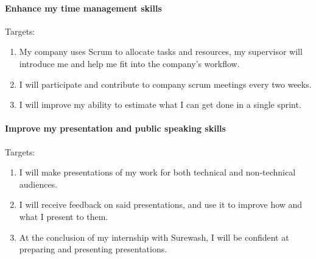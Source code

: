         \paragraph{Enhance my time management skills}
        Targets:
        \begin{enumerate}
            \item My company uses Scrum to allocate tasks and resources, my supervisor will introduce me and help me fit into the company’s workflow.
            \item I will participate and contribute to company scrum meetings every two weeks.
            \item I will improve my ability to estimate what I can get done in a single sprint.
        \end{enumerate}

        \paragraph{Improve my presentation and public speaking skills}
        Targets:
        \begin{enumerate}
            \item I will make presentations of my work for both technical and non-technical audiences.
            \item I will receive feedback on said presentations, and use it to improve how and what I present to them.
            \item At the conclusion of my internship with Surewash, I will be confident at preparing and presenting presentations.
        \end{enumerate}